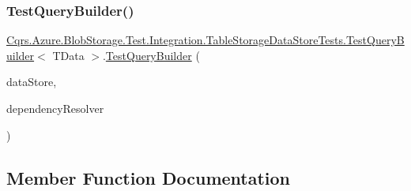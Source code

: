 \subsubsection{\texorpdfstring{Test\+Query\+Builder()}{TestQueryBuilder()}}
{\footnotesize\ttfamily \hyperlink{classCqrs_1_1Azure_1_1BlobStorage_1_1Test_1_1Integration_1_1TableStorageDataStoreTests_1_1TestQueryBuilder}{Cqrs.\+Azure.\+Blob\+Storage.\+Test.\+Integration.\+Table\+Storage\+Data\+Store\+Tests.\+Test\+Query\+Builder}$<$ T\+Data $>$.\hyperlink{classCqrs_1_1Azure_1_1BlobStorage_1_1Test_1_1Integration_1_1TableStorageDataStoreTests_1_1TestQueryBuilder}{Test\+Query\+Builder} (\begin{DoxyParamCaption}\item[{\hyperlink{interfaceCqrs_1_1DataStores_1_1IDataStore}{I\+Data\+Store}$<$ T\+Data $>$}]{data\+Store,  }\item[{\hyperlink{interfaceCqrs_1_1Configuration_1_1IDependencyResolver}{I\+Dependency\+Resolver}}]{dependency\+Resolver }\end{DoxyParamCaption})}



\subsection{Member Function Documentation}
\mbox{\label{classCqrs_1_1Azure_1_1BlobStorage_1_1Test_1_1Integration_1_1TableStorageDataStoreTests_1_1TestQueryBuilder_a4b65d9a13c425df0aa5bd309fc1824de_a4b65d9a13c425df0aa5bd309fc1824de}} 

